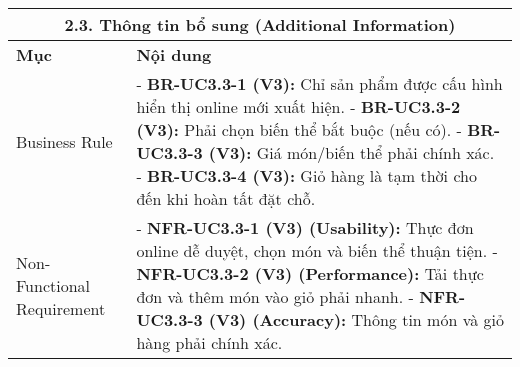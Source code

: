 \begin{longtable}{|m{4cm}|p{11cm}|}
\hline
\multicolumn{2}{|c|}{\textbf{2.3. Thông tin bổ sung (Additional Information)}} \\
\hline
\textbf{Mục} & \textbf{Nội dung} \\
\hline
Business Rule & - \textbf{BR-UC3.3-1 (V3):} Chỉ sản phẩm được cấu hình hiển thị online mới xuất hiện. \newline - \textbf{BR-UC3.3-2 (V3):} Phải chọn biến thể bắt buộc (nếu có). \newline - \textbf{BR-UC3.3-3 (V3):} Giá món/biến thể phải chính xác. \newline - \textbf{BR-UC3.3-4 (V3):} Giỏ hàng là tạm thời cho đến khi hoàn tất đặt chỗ. \\
\hline
Non-Functional Requirement & - \textbf{NFR-UC3.3-1 (V3) (Usability):} Thực đơn online dễ duyệt, chọn món và biến thể thuận tiện. \newline - \textbf{NFR-UC3.3-2 (V3) (Performance):} Tải thực đơn và thêm món vào giỏ phải nhanh. \newline - \textbf{NFR-UC3.3-3 (V3) (Accuracy):} Thông tin món và giỏ hàng phải chính xác. \\
\hline
\end{longtable}

